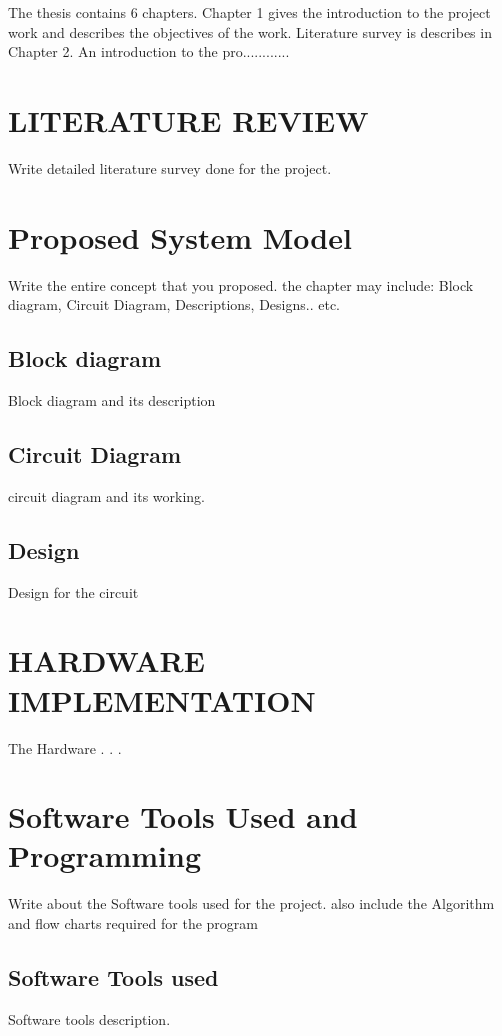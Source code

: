 \documentclass[12pt,a4paper]{report}
\begin{document}
The thesis contains 6 chapters. Chapter 1 gives the introduction to the project work and describes the objectives of the work. Literature survey is describes in Chapter 2. An introduction to the pro............


\chapter{LITERATURE REVIEW}

{Write detailed literature survey done for the project.}





\chapter{Proposed System Model}


{Write the entire concept that you proposed. the chapter may include: Block diagram, Circuit Diagram, Descriptions, Designs.. etc.}
\section{Block diagram}
Block diagram and its description

\section{Circuit Diagram}
circuit diagram and its working.

\section{Design}
Design for the circuit

\chapter{HARDWARE IMPLEMENTATION}

The Hardware . . .


\chapter{Software Tools Used and Programming}

{ Write about the Software tools used for the project. also include the Algorithm and flow charts required for the program}

\section{Software Tools used}
Software tools description.
\end{document}
